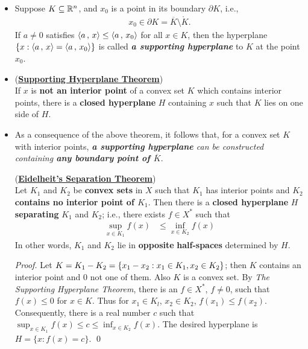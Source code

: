 \documentclass[11pt]{article}
\begin{document}
\begin{itemize}
\item \begin{remark}
Suppose $K \subseteq {\mathbb R}^n$, and $x_0$ is a point in its boundary $\partial K$, i.e.,
\begin{align*}
x_0 \in \partial K = \overline{K} \setminus \mathring{K}.
\end{align*}
If $a \neq 0$ satisfies $\left\langle a\,,\, x \right\rangle \le  \left\langle a\,,\, x_0 \right\rangle$ for all $x \in K$, then the hyperplane $\{x: \left\langle a\,,\, x \right\rangle = \left\langle a\,,\, x_0 \right\rangle\}$
is called \emph{\textbf{a supporting hyperplane}} to $K$ at the point $x_0$.
\end{remark}

\item \begin{theorem} (\underline{\textbf{Supporting Hyperplane Theorem}}) \citep{luenberger1997optimization, rockafellar1970convex} \\
If $x$ is \textbf{not an interior point} of a convex set $K$ which contains interior points, there is a \textbf{closed hyperplane} $H$ containing $x$ such that $K$ lies on one side of $H$.
\end{theorem}

\item As a consequence of the above theorem, it follows that, for a convex set $K$ with interior points, \emph{\textbf{a supporting hyperplane} can be constructed
containing \textbf{any boundary point of $\overline{K}$}}.
\begin{theorem} (\underline{\textbf{Eidelheit's Separation Theorem}})  \citep{luenberger1997optimization, rockafellar1970convex} \\
Let $K_1$ and $K_2$ be \textbf{convex sets} in $X$ such that $K_1$ has interior points and $K_2$ \textbf{contains no interior point of $K_1$}.
Then there is a \textbf{closed hyperplane} $H$ \textbf{separating} $K_1$ and $K_2$; i.e., there exists $f \in X^{*}$ such that 
\begin{align}
\sup_{x \in K_1}f(x) &\le \inf_{x \in K_2}f(x) \label{eqn: convex_duality_weak}
\end{align}
In other words, $K_1$ and $K_2$ lie in \textbf{opposite} \textbf{half-spaces} determined by $H$.
\end{theorem}
\begin{proof}
Let $K = K_1 - K_2 = \left\{x_1 - x_2: x_1 \in K_1, x_2 \in K_2\right\}$; then $K$ contains an interior point and $0$ not one of them. Also $K$ is a convex set. By \emph{The Supporting Hyperplane Theorem},  there is an $f \in X^{*}$, $f \neq 0$, such that $f(x) \le 0$ for $x \in K$. Thus for $x_1 \in K_l$, $x_2 \in K_2$, $f(x_1) \le f(x_2)$. Consequently, there is a real number $c$ such that $\sup_{x \in K_1}f(x) \le c \le \inf_{x \in K_2}f(x)$. The desired hyperplane is $H = \{x:  f(x) = c\}$.  \qed
\end{proof}


\end{itemize}
\end{document}

